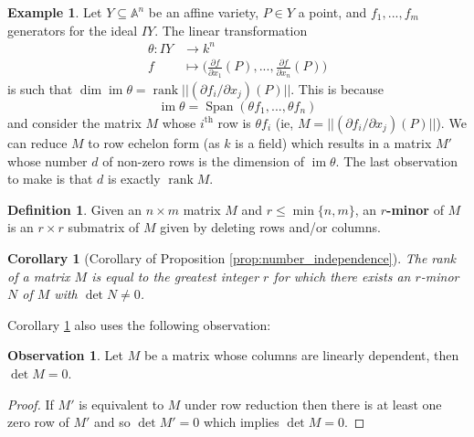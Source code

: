 \documentclass[12pt]{article}
\theoremstyle{plain}
\newtheorem{cor}[thm]{Corollary}
\theoremstyle{definition}
\newtheorem{defn}[thm]{Definition} %
\newtheorem{example}[thm]{Example}
\newtheorem{observation}[thm]{Observation}
\newcommand{\bb}[1]{\mathbb{#1}}
\newcommand{\lto}{\longrightarrow}
\newcommand{\im}{\operatorname{im}}
\begin{document}
\begin{example}
Let $Y \subseteq \bb{A}^n$ be an affine variety, $P \in Y$ a point, and $f_1,...,f_m$ generators for the ideal $IY$. The linear transformation
\begin{align*}
    \theta: IY &\lto k^n\\
    f &\longmapsto \Big(\frac{\partial f}{\partial x_1}(P),...,\frac{\partial f}{\partial x_n}(P)\Big)
\end{align*}
is such that $\operatorname{dim}\operatorname{im}\theta = \operatorname{rank}||(\partial f_i/\partial x_j)(P)||$. This is because
\begin{equation}
    \operatorname{im}\theta = \operatorname{Span}(\theta f_1,...,\theta f_n)
\end{equation}
and consider the matrix $M$ whose $i^{\text{th}}$ row is $\theta f_i$ (ie, $M = ||(\partial f_i/\partial x_j)(P)||$). We can reduce $M$ to row echelon form (as $k$ is a field) which results in a matrix $M'$ whose number $d$ of non-zero rows is the dimension of $\operatorname{\im}\theta$. The last observation to make is that $d$ is exactly $\operatorname{rank}M$.
\end{example}
\begin{defn}
Given an $n \times m$ matrix $M$ and $r \leq \operatorname{min}\lbrace n,m\rbrace$, an \textbf{$r$-minor} of $M$ is an $r\times r$ submatrix of $M$ given by deleting rows and/or columns.
\end{defn}
\begin{cor}[Corollary of Proposition \ref{prop:number_independence}]\label{cor:det_minor}
The rank of a matrix $M$ is equal to the greatest integer $r$ for which there exists an $r$-minor $N$ of $M$ with $\operatorname{det}N \neq 0$.
\end{cor}
Corollary \ref{cor:det_minor} also uses the following observation:
\begin{observation}
Let $M$ be a matrix whose columns are linearly dependent, then $\operatorname{det}M = 0$.
\end{observation}
\begin{proof}
If $M'$ is equivalent to $M$ under row reduction then there is at least one zero row of $M'$ and so $\operatorname{det}M' = 0$ which implies $\operatorname{det}M = 0$.
\end{proof}
\end{document}
